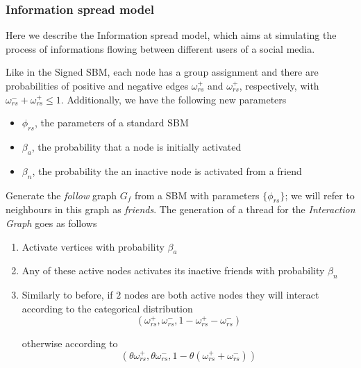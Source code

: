 \subsubsection{Information spread model}%
\label{ssub:information_spread_model}

Here we describe the Information spread model, which aims at simulating the
process of informations flowing between different users of a social media.

Like in the Signed SBM, each node has a group assignment and there are probabilities of
positive and negative edges $\omega _{rs}^{+}  $ and $\omega _{rs}^{+}  $,
respectively, with $\omega ^{-} _{rs} + \omega ^{+} _{rs}
	\leq 1$. Additionally, we have the following new parameters

\begin{itemize}
	\item ${\phi_{rs} }$, the parameters of a standard SBM
	\item $\beta _a$, the probability that a node is initially activated
	\item $\beta _n$, the probability the an inactive node is activated
	      from a friend
\end{itemize}

\bigskip
Generate the \emph{follow} graph $G_{f}$ from a SBM with parameters $\{ \phi
	_{rs}  \}$; we will refer to neighbours in this graph as \emph{friends}.
The generation of a thread for the \emph{Interaction Graph} goes as follows

\begin{enumerate}
	\item Activate vertices with probability $\beta_{a}  $
	\item Any of these active nodes activates its inactive friends with
	      probability $\beta_n$
	\item Similarly to before, if $2$ nodes are both active nodes they will interact according to the categorical distribution
	      \begin{equation*}
		      (\omega _{rs}
		      ^{+}, \omega _{rs} ^{-}, 1 - \omega _{rs} ^{+} - \omega _{rs} ^{-})
	      \end{equation*}

	      otherwise according to
	      \begin{equation*}
		      (\theta \omega _{rs} ^{+}, \theta \omega _{rs} ^{-}, 1
		      - \theta (\omega _{rs} ^{+} + \omega _{rs} ^{-}))
	      \end{equation*}
\end{enumerate}

